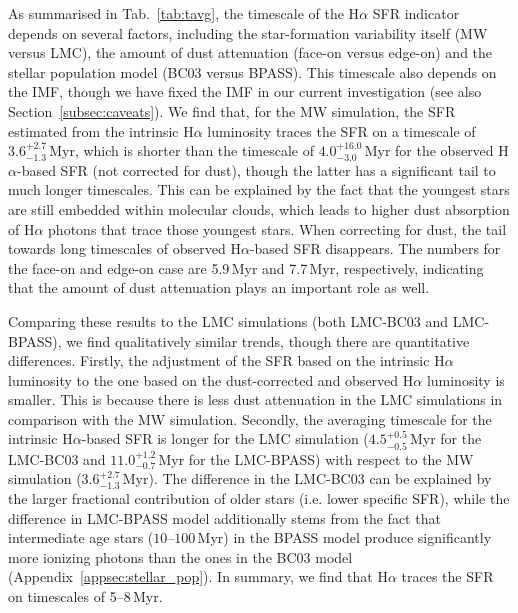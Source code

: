 \documentclass[fleqn,usenatbib]{mnras}
\begin{document}
As summarised in Tab.~\ref{tab:tavg}, the timescale of the H$\alpha$ SFR indicator depends on several factors, including the star-formation variability itself (MW versus LMC), the amount of dust attenuation (face-on versus edge-on) and the stellar population model (BC03 versus BPASS). This timescale also depends on the IMF, though we have fixed the IMF in our current investigation (see also Section~\ref{subsec:caveats}). We find that, for the MW simulation, the SFR estimated from the intrinsic H$\alpha$ luminosity traces the SFR on a timescale of $3.6_{-1.3}^{+2.7}$\,Myr, which is shorter than the timescale of $4.0_{-3.0}^{+16.0}$\,Myr for the observed H$\alpha$-based SFR (not corrected for dust), though the latter has a significant tail to much longer timescales. This can be explained by the fact that the youngest stars are still embedded within molecular clouds, which leads to higher dust absorption of H$\alpha$ photons that trace those youngest stars. When correcting for dust, the tail towards long timescales of observed H$\alpha$-based SFR disappears. The numbers for the face-on and edge-on case are 5.9\,Myr and 7.7\,Myr, respectively, indicating that the amount of dust attenuation plays an important role as well.

Comparing these results to the LMC simulations (both LMC-BC03 and LMC-BPASS), we find qualitatively similar trends, though there are quantitative differences. Firstly, the adjustment of the SFR based on the intrinsic H$\alpha$ luminosity to the one based on the dust-corrected and observed H$\alpha$ luminosity is smaller. This is because there is less dust attenuation in the LMC simulations in comparison with the MW simulation. Secondly, the averaging timescale for the intrinsic H$\alpha$-based SFR is longer for the LMC simulation ($4.5_{-0.5}^{+0.5}$\,Myr for the LMC-BC03 and $11.0_{-0.7}^{+1.2}$\,Myr for the LMC-BPASS) with respect to the MW simulation ($3.6_{-1.3}^{+2.7}$\,Myr). The difference in the LMC-BC03 can be explained by the larger fractional contribution of older stars (i.e. lower specific SFR), while the difference in LMC-BPASS model additionally stems from the fact that intermediate age stars ($10$--$100$\,Myr) in the BPASS model produce significantly more ionizing photons than the ones in the BC03 model (Appendix~\ref{appsec:stellar_pop}). In summary, we find that H$\alpha$ traces the SFR on timescales of 5--8\,Myr.
\end{document}
